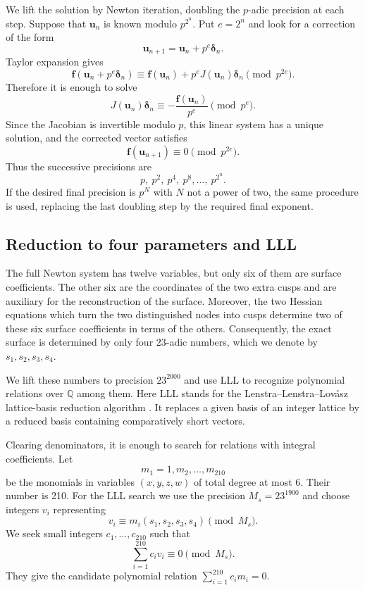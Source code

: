 \documentclass[10pt,a4paper]{article}
\begin{document}
We lift the solution by Newton iteration, doubling the $p$-adic precision at
each step.  Suppose that $\boldsymbol u_n$ is known modulo
$p^{2^n}$.  Put $e=2^n$ and look for a correction of the form
\[
        \boldsymbol u_{n+1}
        =
        \boldsymbol u_n+p^e\boldsymbol\delta_n.
\]
Taylor expansion gives
\[
\boldsymbol f(\boldsymbol u_n+p^e\boldsymbol\delta_n)
\equiv
\boldsymbol f(\boldsymbol u_n)
+p^eJ(\boldsymbol u_n)\boldsymbol\delta_n
\pmod{p^{2e}}.
\]
Therefore it is enough to solve
\begin{equation}
 \label{eq:newton-lifting}
 J(\boldsymbol u_n)\boldsymbol\delta_n
 \equiv
 -\frac{\boldsymbol f(\boldsymbol u_n)}{p^e}
 \pmod {p^e}.
\end{equation}
Since the Jacobian is invertible modulo $p$, this linear system has a unique
solution, and the corrected vector satisfies
\[
        \boldsymbol f(\boldsymbol u_{n+1})
        \equiv0\pmod {p^{2e}}.
\]
Thus the successive precisions are
\[
        p,\ p^2,\ p^4,\ p^8,\ldots,\ p^{2^n}.
\]
If the desired final precision is $p^N$ with $N$ not a power of two, the same
procedure is used, replacing the last doubling step by the required final
exponent.

\subsection{Reduction to four parameters and LLL}

The full Newton system has twelve variables, but only six of them are surface
coefficients. The other six are the coordinates of the two extra cusps and
are auxiliary for the reconstruction of the surface.  Moreover, the two
Hessian equations which turn the two distinguished nodes into cusps determine
two of these six surface coefficients in terms of the others.  Consequently,
the exact surface is determined by only four $23$-adic numbers, which we
denote by $s_1,s_2,s_3,s_4$.

We lift these numbers to precision $23^{2000}$ and use LLL to
recognize polynomial relations over $\mathbb Q$ among them.  Here LLL stands
for the Lenstra--Lenstra--Lov\'asz lattice-basis reduction algorithm \cite{LLL82}.  It
replaces a given basis of an integer lattice by a reduced basis containing
comparatively short vectors.

Clearing denominators, it is enough to search for relations with integral
coefficients.  Let
\[
        m_1=1,m_2,\ldots,m_{210}
\]
be the monomials in variables $(x,y,z,w)$ of total degree at most $6$. Their
number is 210.
For the LLL search we use the precision
\(
        M_s=23^{1900}
\)
and choose integers $v_i$ representing
\[
        v_i\equiv m_i(s_1,s_2,s_3,s_4)\pmod {M_s}.
\]
We seek small integers $c_1,\ldots,c_{210}$ such that
\[
        \sum_{i=1}^{210}c_iv_i\equiv0\pmod {M_s}.
\]
They give the candidate polynomial relation
\(
        \sum_{i=1}^{210}c_im_i=0
\).
\end{document}
